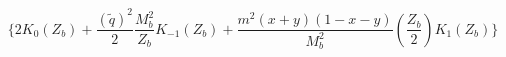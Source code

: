 \begin{equation}\biggl\{2K_{0}(Z_{b})+\frac{(\widetilde{q})^{2}}{2}\frac{M_{b}^{2}}{Z_{b}}K_{-1}(Z_{b})
+\frac{m^{2}(x+y)(1-x-y)}{M_{b}^{2}}\left(\frac{Z_{b}}{2}\right)K_{1}(Z_{b})\biggr\}
\end{equation}

